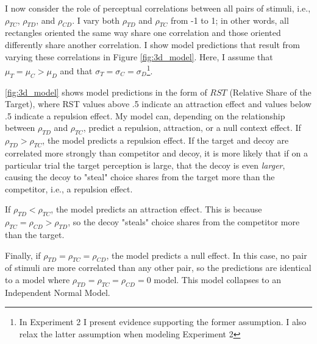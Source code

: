 I now consider the role of perceptual correlations between all pairs of stimuli, i.e., $\rho_{TC}$, $\rho_{TD}$, and $\rho_{CD}$. I vary both $\rho_{TD}$ and $\rho_{TC}$ from -1 to 1; in other words, all rectangles oriented the same way share one correlation and those oriented differently share another correlation. I show model predictions that result from varying these correlations in Figure \ref{fig:3d_model}. Here, I assume that $\mu_{T}=\mu_{C}>\mu_{D}$ and that $\sigma_{T}=\sigma_{C}=\sigma_{D}$\footnote{In Experiment 2 I present evidence supporting the former assumption. I also relax the latter assumption when modeling Experiment 2}. 

\ref{fig:3d_model} shows model predictions in the form of $RST$ (Relative Share of the Target), where RST values above .5 indicate an attraction effect and values below .5 indicate a repulsion effect. My model can, depending on the relationship between $\rho_{TD}$ and $\rho_{TC}$, predict a repulsion, attraction, or a null context effect. If $\rho_{TD}>\rho_{TC}$, the model predicts a repulsion effect. If the target and decoy are correlated more strongly than competitor and decoy, it is more likely that if on a particular trial the target perception is large, that the decoy is even \textit{larger}, causing the decoy to "steal" choice shares from the target more than the competitor, i.e., a repulsion effect.

If $\rho_{TD}<\rho_{TC}$, the model predicts an attraction effect. This is because $\rho_{TC}=\rho_{CD}>\rho_{TD}$, so the decoy "steals" choice shares from the competitor more than the target. 

Finally, if $\rho_{TD}=\rho_{TC}=\rho_{CD}$, the model predicts a null effect. In this case, no pair of stimuli are more correlated than any other pair, so the predictions are identical to a model where $\rho_{TD}=\rho_{TC}=\rho_{CD}=0$ model. This model collapses to an Independent Normal Model. 

